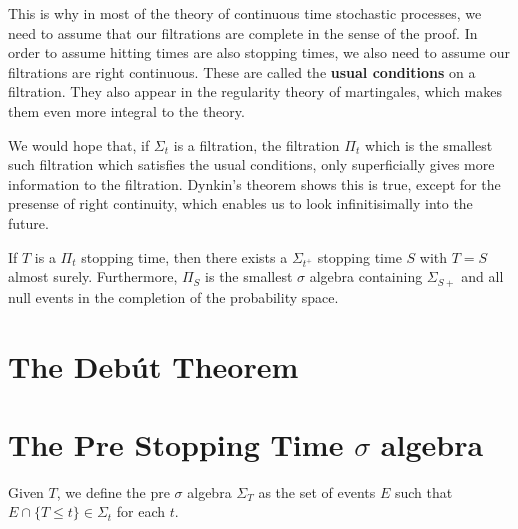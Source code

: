This is why in most of the theory of continuous time stochastic processes, we need to assume that our filtrations are complete in the sense of the proof. In order to assume hitting times are also stopping times, we also need to assume our filtrations are right continuous. These are called the {\bf usual conditions} on a filtration. They also appear in the regularity theory of martingales, which makes them even more integral to the theory.

We would hope that, if $\Sigma_t$ is a filtration, the filtration $\Pi_t$ which is the smallest such filtration which satisfies the usual conditions, only superficially gives more information to the filtration. Dynkin's theorem shows this is true, except for the presense of right continuity, which enables us to look infinitisimally into the future.

\begin{theorem}
    If $T$ is a $\Pi_t$ stopping time, then there exists a $\Sigma_{t^+}$ stopping time $S$ with $T = S$ almost surely. Furthermore, $\Pi_S$ is the smallest $\sigma$ algebra containing $\Sigma_{S+}$ and all null events in the completion of the probability space.
\end{theorem}

\section{The Deb\'{u}t Theorem}

\section{The Pre Stopping Time $\sigma$ algebra}

Given $T$, we define the pre $\sigma$ algebra $\Sigma_T$ as the set of events $E$ such that $E \cap \{ T \leq t \} \in \Sigma_t$ for each $t$.


